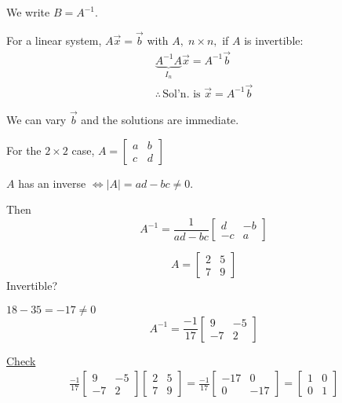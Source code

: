 \documentclass[../main.tex]{subfiles}
\begin{document}
We write \( B = A^{-1} \).

For a linear system, \( A \vec{x} = \vec{b} \) with \( A, \; n \times n, \) if \( A \) is invertible:
\begin{gather*}
    \underbrace{A^{-1}A}_{I_n} \vec{x} = A^{-1} \vec{b} \\
    \therefore \, \text{Sol'n. is } \vec{x} = A^{-1} \vec{b}
\end{gather*}

We can vary \( \vec{b} \) and the solutions are immediate.

For the \( 2 \times 2 \) case,
\( A = \begin{bmatrix}
    a & b \\
    c & d
\end{bmatrix} \)

\( A \) has an inverse \( \iff |A| = ad - bc \neq 0 \).

Then \[ A^{-1} = \frac{1}{ad-bc}
    \begin{bmatrix}
        d & -b \\
        -c & a
    \end{bmatrix} 
\]

\begin{example}[]
    \[ A = \begin{bmatrix}
        2 & 5 \\
        7 & 9
    \end{bmatrix} \]
    Invertible?

    \( 18 - 35 = -17 \neq 0 \) \checkmark
    \[ A^{-1} = \frac{-1}{17} \begin{bmatrix}
        9 & -5 \\
        -7 & 2
    \end{bmatrix} \]

    \underline{Check}
    \begin{gather*}
        \frac{-1}{17}
        \begin{bmatrix}
            9 & -5 \\
            -7 & 2
        \end{bmatrix}
        \begin{bmatrix}
            2 & 5 \\
            7 & 9
        \end{bmatrix}
        = \frac{-1}{17}
        \begin{bmatrix}
            -17 & 0 \\
            0 & -17
        \end{bmatrix}
        = \begin{bmatrix}
            1 & 0 \\
            0 & 1
        \end{bmatrix}
    \end{gather*}
\end{example}
\end{document}
